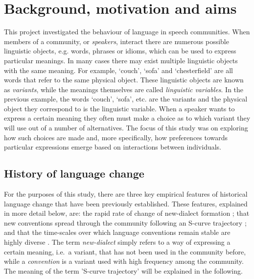 \documentclass[12pt]{article}
\begin{document}
\section{Background, motivation and aims}
This project investigated the behaviour of language in speech communities. When members of a community, or \emph{speakers}, interact there are numerous possible linguistic objects, e.g. words, phrases or idioms, which can be used to express particular meanings. In many cases there may exist multiple linguistic objects with the same meaning. For example, `couch', `sofa' and `chesterfield' are all words that refer to the same physical object. These linguistic objects are known as \emph{variants}, while the meanings themselves are called \emph{linguistic variables}. In the previous example, the words `couch', `sofa', etc. are the variants and the physical object they correspond to is the linguistic variable. When a speaker wants to express a certain meaning they often must make a choice as to which variant they will use out of a number of alternatives. The focus of this study was on exploring how such choices are made and, more specifically, how preferences towards particular expressions emerge based on interactions between individuals.  

\subsection{History of language change}
For the purposes of this study, there are three key empirical features of historical language change that have been previously established. These features, explained in more detail below, are: the rapid rate of change of new-dialect formation \cite{ref1}; that new conventions spread through the community following an S-curve trajectory \cite{Scurve}; and that the time-scales over which language conventions remain stable are highly diverse \cite{ref3}. The term \emph{new-dialect} simply refers to a way of expressing a certain meaning, i.e.\ a variant, that has not been used in the community before, while a \emph{convention} is a variant used with high frequency among the community. The meaning of the term 'S-curve trajectory' will be explained in the following.
\end{document}
